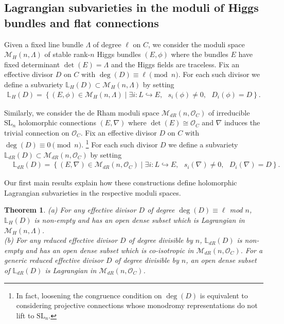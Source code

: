 \documentclass[twoside, 11pt]{article}
\numberwithin{equation}{section}
\theoremstyle{theorem}
\newtheorem{theorem}{Theorem}
\numberwithin{theorem}{section}
\theoremstyle{definition}
\begin{document}
\subsection{Lagrangian subvarieties in the moduli of Higgs bundles and flat connections}
\label{sect-intro-lag-property}
Given a fixed line bundle $\Lambda$ of degree $\ell$ on $C$, we consider the moduli space $\mathcal{M}_{H}(n, \Lambda)$ of stable rank-$n$ Higgs bundles $(E, \phi)$ where the bundles $E$ have fixed determinant $\det(E) = \Lambda$ and the Higgs fields are traceless.  
Fix an effective divisor $D$ on $C$ with $\deg(D) \equiv \ell \pmod{n}$. For each such divisor we define a subvariety $\mathbb{L}_{H}(D) \subset \mathcal{M}_{H}(n, \Lambda)$ by setting 
\begin{align*}
\mathbb{L}_{H}(D) = 
\left\{ (E, \phi) \in \mathcal{M}_{H}(n, \Lambda) 
\mid \exists i: L \hookrightarrow E, \text{ } s_i(\phi) \neq 0,  \text{ } D_i(\phi) = D\right\}.
\end{align*}


Similarly, we consider the de Rham moduli space $\mathcal{M}_{dR}(n, \mathcal{O}_C)$ of irreducible $\mathrm{SL}_n$ holomorphic connections $(E, \nabla)$ where $\det(E) \cong \mathcal{O}_C$ and $\nabla$ induces the trivial connection on $\mathcal{O}_C$. 
Fix an effective divisor $D$ on $C$ with $\deg(D) \equiv 0 \pmod{n}$.
\footnote{In fact, loosening the congruence condition on $\deg(D)$ is equivalent to considering projective connections whose monodromy representations do not lift to $\mathrm{SL}_n$.}
For each such divisor $D$ we define a subvariety $\mathbb{L}_{dR}(D) \subset \mathcal{M}_{dR}(n, \mathcal{O}_C)$ by setting 
\begin{align*}
&\mathbb{L}_{dR}(D) = \left\{ (E, \nabla) \in \mathcal{M}_{dR}(n, \mathcal{O}_C)  
\mid \exists i: L \hookrightarrow E, \text{ } s_i(\nabla) \neq 0,  \text{ } D_i(\nabla) = D \right\}.
\end{align*}

Our first main results explain how these constructions define holomorphic Lagrangian subvarieties in the respective moduli spaces.

\begin{theorem}\label{intro-main-thm-1} 
(a) For any effective divisor $D$ of degree $\deg(D) \equiv \ell$ mod $n$, $\mathbb{L}_H(D)$ is non-empty and has an open dense subset which is Lagrangian in $\mathcal{M}_H(n, \Lambda)$. 
\\
(b) For any reduced effective divisor $D$ of degree divisible by $n$, $\mathbb{L}_{dR}(D)$ is non-empty and has an open dense subset which is co-isotropic in $\mathcal{M}_{dR}(n, \mathcal{O}_C)$.
For a generic reduced effective divisor $D$ of degree divisible by $n$, an open dense subset of $\mathbb{L}_{dR}(D)$ is Lagrangian in $\mathcal{M}_{dR}(n, \mathcal{O}_C)$.
\end{theorem}
\end{document}
